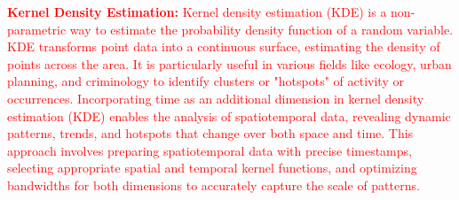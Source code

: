 \documentclass[acmsmall]{acmart}
\begin{document}
\textcolor{red}{\textbf{Kernel Density Estimation:} Kernel density estimation (KDE) is a non-parametric way to estimate the probability density function of a random variable. KDE transforms point data into a continuous surface, estimating the density of points across the area. It is particularly useful in various fields like ecology, urban planning, and criminology to identify clusters or "hotspots" of activity or occurrences. Incorporating time as an additional dimension in kernel density estimation (KDE) enables the analysis of spatiotemporal data, revealing dynamic patterns, trends, and hotspots that change over both space and time. This approach involves preparing spatiotemporal data with precise timestamps, selecting appropriate spatial and temporal kernel functions, and optimizing bandwidths for both dimensions to accurately capture the scale of patterns.}

\end{document}
